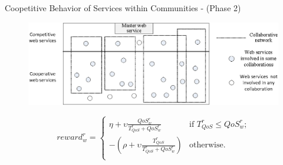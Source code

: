 \documentclass{beamer}
\begin{document}
\begin{frame}{Coopetitive Behavior of Services within Communities - (Phase 2)}
    \begin{figure}[h]
        \centering
        \includegraphics[scale=0.6]{figures/architecture++.eps}
        \label{architectureFigure}
    \end{figure}

    \begin{equation*} \label{repr}
        reward_w^r = \begin{cases}
        \eta + \upsilon \frac{QoS_w^r}{T_{QoS}^r+QoS_w^r}   & \text{if $T_{QoS}^r\leq QoS_w^r$;}\\
        -(\rho +  \upsilon \frac{T_{QoS}^r}{T_{QoS}^r+QoS_w^r} ) & \text{otherwise.}\\
        \end{cases}
    \end{equation*}



%


\end{frame}
\end{document}

